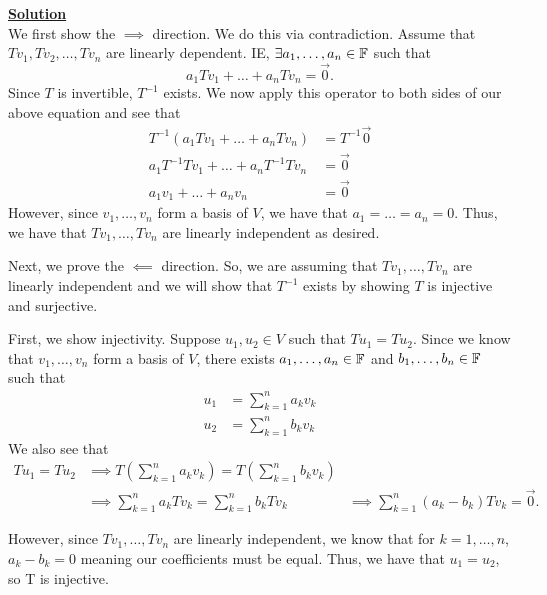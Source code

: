 \documentclass[answers]{exam}
\begin{document}
\begin{questions}
\begin{solution}
        \underline{\textbf{Solution}}\\
        We first show the $\implies$ direction. We do this via contradiction. 
        Assume that $Tv_1,Tv_2,\dots,Tv_n$ are linearly dependent. IE, $\exists a_1,\dots,a_n\in\mathbb{F}$ such that 
        \[
            a_1Tv_1 + \dots + a_nTv_n = \vec{0}.
        \]
        Since $T$ is invertible, $T^{-1}$ exists. We now apply this operator to both sides of our above equation 
        and see that
        \begin{align*}
            T^{-1}\left(a_1Tv_1 + \dots + a_nTv_n\right) &= T^{-1}\vec{0} \\
            a_1T^{-1}Tv_1 + \dots + a_nT^{-1}Tv_n &= \vec{0} \\
            a_1v_1 + \dots + a_nv_n &= \vec{0}
        \end{align*}
        However, since $v_1,\dots,v_n$ form a basis of $V$, we have that $a_1=\dots =a_n=0$. Thus, we have that
        $Tv_1,\dots,Tv_n$ are linearly independent as desired.

        Next, we prove the $\impliedby$ direction. So, we are assuming that $Tv_1,\dots,Tv_n$ are linearly
        independent and we will show that $T^{-1}$ exists by showing $T$ is injective and surjective.

        First, we show injectivity. Suppose $u_1,u_2\in V$ such that $Tu_1 = Tu_2$. Since we know that
        $v_1,\dots,v_n$ form a basis of $V$, there exists $a_1,\dots,a_n\in\mathbb{F}$ and $b_1,\dots,b_n\in\mathbb{F}$ such that 
        \begin{align*}
            u_1 &= \sum_{k=1}^na_kv_k\\
            u_2 &= \sum_{k=1}^nb_kv_k
        \end{align*}
        We also see that
        \begin{align*}
            Tu_1 = Tu_2 &\implies T\left(\sum_{k=1}^n a_kv_k\right) = T\left(\sum_{k=1}^n b_kv_k\right) \\
            &\implies \sum_{k=1}^n a_kTv_k = \sum_{k=1}^n b_kTv_k
            &\implies \sum_{k=1}^n\left(a_k-b_k\right)Tv_k = \vec{0}.
        \end{align*}

        However, since $Tv_1,\dots,Tv_n$ are linearly independent, we know that for $k=1,\dots,n$, $a_k-b_k=0$
        meaning our coefficients must be equal. Thus, we have that $u_1=u_2$, so T is injective.


\end{solution}
\end{questions}
\end{document}

